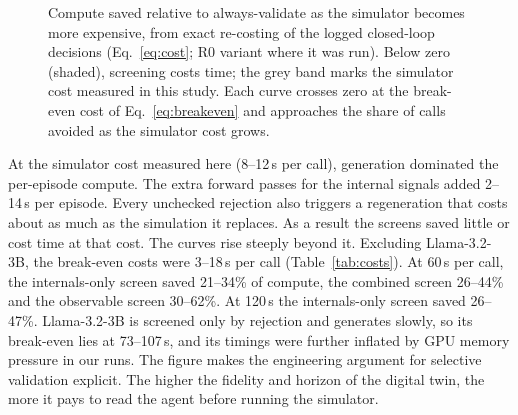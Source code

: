 \begin{figure}[!htbp]
\centering

\caption{Compute saved relative to always-validate as the simulator becomes more expensive, from exact re-costing
of the logged closed-loop decisions (Eq.~\ref{eq:cost}; R0 variant where it was run). Below zero (shaded),
screening costs time; the grey band marks the simulator cost measured in this study. Each curve crosses zero at
the break-even cost of Eq.~\eqref{eq:breakeven} and approaches the share of calls avoided as the simulator cost
grows.}
\label{fig:savings}
\end{figure}

At the simulator cost measured here (8--12\,s per call), generation dominated the per-episode compute. The extra
forward passes for the internal signals added 2--14\,s per episode. Every unchecked rejection also triggers a
regeneration that costs about as much as the simulation it replaces. As a result the screens saved little or cost
time at that cost. The curves rise steeply beyond it. Excluding Llama-3.2-3B, the break-even costs were 3--18\,s
per call (Table~\ref{tab:costs}). At 60\,s per call, the internals-only screen saved 21--34\% of compute, the
combined screen 26--44\% and the observable screen 30--62\%. At 120\,s the internals-only screen saved 26--47\%.
Llama-3.2-3B is screened only by rejection and generates slowly, so its break-even lies at 73--107\,s, and its
timings were further inflated by GPU memory pressure in our runs. The figure makes the engineering argument for
selective validation explicit. The higher the fidelity and horizon of the digital twin, the more it pays to read
the agent before running the simulator.
